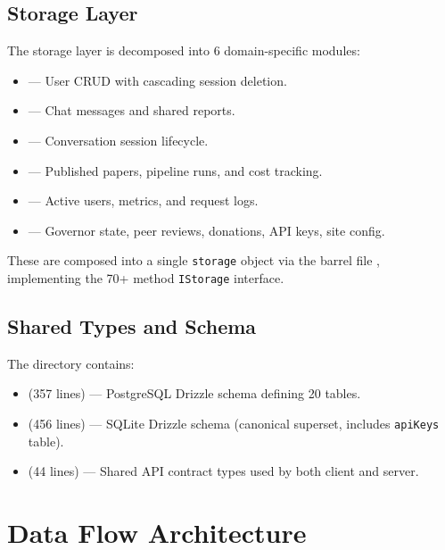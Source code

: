 \subsection{Storage Layer}

The storage layer is decomposed into 6 domain-specific modules:

\begin{itemize}
  \item {} --- User CRUD with cascading session deletion.
  \item {} --- Chat messages and shared reports.
  \item {} --- Conversation session lifecycle.
  \item {} --- Published papers, pipeline runs, and cost tracking.
  \item {} --- Active users, metrics, and request logs.
  \item {} --- Governor state, peer reviews, donations, API keys, site config.
\end{itemize}

These are composed into a single \texttt{storage} object via the barrel file , implementing the 70+ method \texttt{IStorage} interface.

\subsection{Shared Types and Schema}

The  directory contains:

\begin{itemize}
  \item {} (357 lines) --- PostgreSQL Drizzle schema defining 20 tables.
  \item {} (456 lines) --- SQLite Drizzle schema (canonical superset, includes \texttt{apiKeys} table).
  \item {} (44 lines) --- Shared API contract types used by both client and server.
\end{itemize}

\section{Data Flow Architecture}
\label{sec:arch:dataflow}


